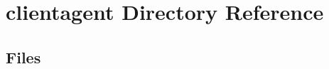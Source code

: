\section{clientagent Directory Reference}
\label{dir_e168b1eeb8cd8e7cbfe8a79e9ea3f3d8}
\subsection*{Files}
\begin{DoxyCompactItemize}
\end{DoxyCompactItemize}
